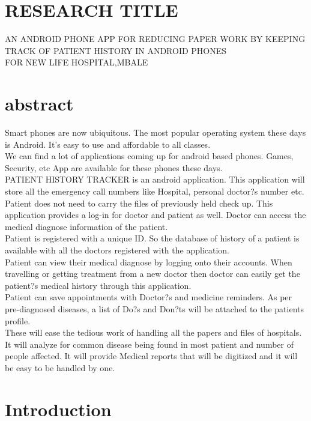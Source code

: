 \documentclass[12pt,]{article}
\begin{document}
\section{RESEARCH TITLE}
AN ANDROID PHONE APP FOR REDUCING PAPER WORK BY KEEPING TRACK OF PATIENT HISTORY IN ANDROID PHONES\\ FOR NEW LIFE HOSPITAL,MBALE 

\section{abstract}

Smart phones are now ubiquitous. The most popular operating system these days is Android. It's easy to use and affordable to all classes.\\ We can find a lot of applications coming up for android based phones. Games, Security, etc App are available for these phones these days.\\ PATIENT HISTORY TRACKER is an android application. This application will store all the emergency call numbers like Hospital, personal doctor?s number etc. Patient does not need to carry the files of previously held check up. This application provides a log-in for doctor and patient as well. Doctor can access the medical diagnose information of the patient.\\ Patient is registered with a unique ID. So the database of history of a patient is available with all the doctors registered with the application.\\ Patient can view their medical diagnose by logging onto their accounts. When travelling or getting treatment from a new doctor then doctor can easily get the patient?s medical history through this application.\\ Patient can save appointments with Doctor?s and medicine reminders. As per pre-diagnosed diseases, a list of Do?s and Don?ts will be attached to the patients profile. \\These will ease the tedious work of handling all the papers and files of hospitals.\\ It will analyze for common disease being found in most patient and number of people affected. It will provide Medical reports that will be digitized and it will be easy to be handled by one.

\section{Introduction}
\end{document}
